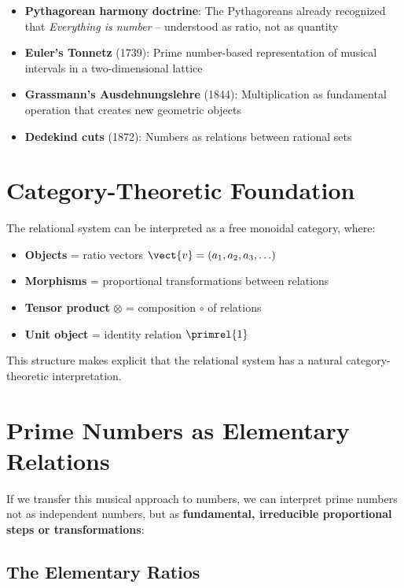 	\begin{itemize}
		\item \textbf{Pythagorean harmony doctrine}: The Pythagoreans already recognized that \emph{Everything is number} -- understood as ratio, not as quantity
		\item \textbf{Euler's Tonnetz} (1739): Prime number-based representation of musical intervals in a two-dimensional lattice
		\item \textbf{Grassmann's Ausdehnungslehre} (1844): Multiplication as fundamental operation that creates new geometric objects
		\item \textbf{Dedekind cuts} (1872): Numbers as relations between rational sets
	\end{itemize}
	
	\section{Category-Theoretic Foundation}
	
	\begin{category}
		The relational system can be interpreted as a free monoidal category, where:
		\begin{itemize}
			\item \textbf{Objects} = ratio vectors $\vect{v} = (a_1, a_2, a_3, \ldots)$
			\item \textbf{Morphisms} = proportional transformations between relations
			\item \textbf{Tensor product} $\otimes$ = composition $\circ$ of relations
			\item \textbf{Unit object} = identity relation $\primrel{1}$
		\end{itemize}
		
		This structure makes explicit that the relational system has a natural category-theoretic interpretation.
	\end{category}
	
	\section{Prime Numbers as Elementary Relations}
	
	If we transfer this musical approach to numbers, we can interpret prime numbers not as independent numbers, but as \textbf{fundamental, irreducible proportional steps or transformations}:
	
	\subsection{The Elementary Ratios}
	
